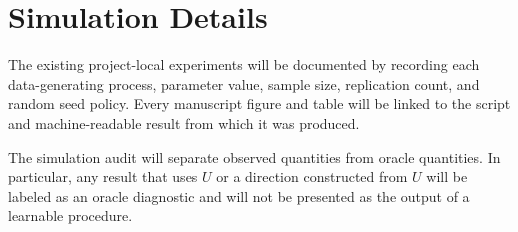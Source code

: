 \section{Simulation Details}
\label{app:simulations}

The existing project-local experiments will be documented by recording each data-generating process, parameter value, sample size, replication count, and random seed policy. Every manuscript figure and table will be linked to the script and machine-readable result from which it was produced.

The simulation audit will separate observed quantities from oracle quantities. In particular, any result that uses $U$ or a direction constructed from $U$ will be labeled as an oracle diagnostic and will not be presented as the output of a learnable procedure.
